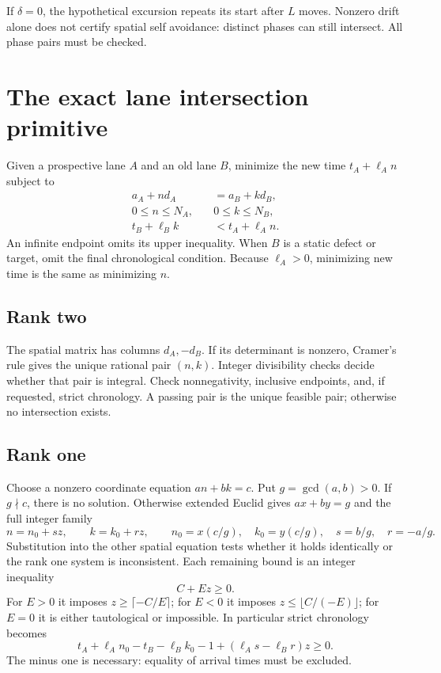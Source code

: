 \documentclass[11pt,letterpaper]{article}
\theoremstyle{definition}\newtheorem{definition}[theorem]{Definition}
\theoremstyle{remark}\newtheorem{remark}[theorem]{Remark}
\begin{document}
If $\delta=0$, the hypothetical excursion repeats its start after $L$ moves. Nonzero drift alone does not certify spatial self avoidance: distinct phases can still intersect. All phase pairs must be checked.

\section{The exact lane intersection primitive}\label{ptr:sec:intersection}
Given a prospective lane $A$ and an old lane $B$, minimize the new time $t_A+\ell_A n$ subject to
\begin{align}\label{ptr:eq:relation}
 a_A+n d_A&=a_B+k d_B,\\
 0\le n\le N_A,\quad&0\le k\le N_B,\nonumber\\
 t_B+\ell_B k&<t_A+\ell_A n.\nonumber
\end{align}
An infinite endpoint omits its upper inequality. When $B$ is a static defect or target, omit the final chronological condition. Because $\ell_A>0$, minimizing new time is the same as minimizing $n$.

\subsection{Rank two}
The spatial matrix has columns $d_A,-d_B$. If its determinant is nonzero, Cramer's rule gives the unique rational pair $(n,k)$. Integer divisibility checks decide whether that pair is integral. Check nonnegativity, inclusive endpoints, and, if requested, strict chronology. A passing pair is the unique feasible pair; otherwise no intersection exists.

\subsection{Rank one}
Choose a nonzero coordinate equation $an+bk=c$. Put $g=\gcd(a,b)>0$. If $g\nmid c$, there is no solution. Otherwise extended Euclid gives $ax+by=g$ and the full integer family
\begin{equation}\label{ptr:eq:bezout}
 n=n_0+s z,\qquad k=k_0+r z,\qquad
 n_0=x(c/g),\quad k_0=y(c/g),\quad s=b/g,\quad r=-a/g.
\end{equation}
Substitution into the other spatial equation tests whether it holds identically or the rank one system is inconsistent. Each remaining bound is an integer inequality
\[
 C+E z\ge0.
\]
For $E>0$ it imposes $z\ge\lceil-C/E\rceil$; for $E<0$ it imposes $z\le\lfloor C/(-E)\rfloor$; for $E=0$ it is either tautological or impossible. In particular strict chronology becomes
\begin{equation}\label{ptr:eq:strict}
 t_A+\ell_A n_0-t_B-\ell_B k_0-1
       +(\ell_A s-\ell_B r)z\ge0.
\end{equation}
The minus one is necessary: equality of arrival times must be excluded.
\end{document}
